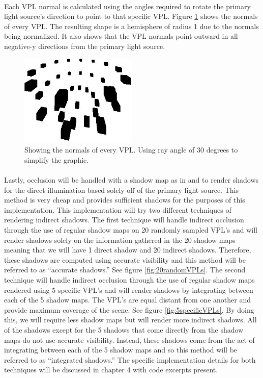 \paragraph{}
Each VPL normal is calculated using the angles required to rotate the primary light source's direction to point to that specific VPL.  Figure \ref{fig:vplNormals} shows the normals of every VPL.  The resulting shape is a hemisphere of radius 1 due to the normals being normalized.  It also shows that the VPL normals point outward in all negative-y directions from the primary light source.

\begin{figure}[h!]
  \centering
    \includegraphics[width=0.5\textwidth]{vplNormals.jpg}
  	\caption{Showing the normals of every VPL. Using ray angle of 30 degrees to simplify the graphic.}
	\label{fig:vplNormals}
\end{figure}

\paragraph{}
Lastly, occlusion will be handled with a shadow map as in \cite{Williams1978} and \cite{Reeves1987} to render shadows for the direct illumination based solely off of the primary light source.  This method is very cheap and provides sufficient shadows for the purposes of this implementation.  This implementation will try two different techniques of rendering indirect shadows.  The first technique will handle indirect occlusion through the use of regular shadow maps on 20 randomly sampled VPL's and will render shadows solely on the information gathered in the 20 shadow maps meaning that we will have 1 direct shadow and 20 indirect shadows.  Therefore, these shadows are computed using accurate visibility and this method will be referred to as ``accurate shadows.''  See figure \ref{fig:20randomVPLs}.  The second technique will handle indirect occlusion through the use of regular shadow maps rendered using 5 specific VPL's and will render shadows by integrating between each of the 5 shadow maps.  The VPL's are equal distant from one another and provide maximum coverage of the scene.  See figure \ref{fig:5specificVPLs}.  By doing this, we will require less shadow maps but will render more indirect shadows.  All of the shadows except for the 5 shadows that come directly from the shadow maps do not use accurate visibility.  Instead, these shadows come from the act of integrating between each of the 5 shadow maps and so this method will be referred to as ``integrated shadows.''  The specific implementation details for both techniques will be discussed in chapter 4 with code excerpts present.

